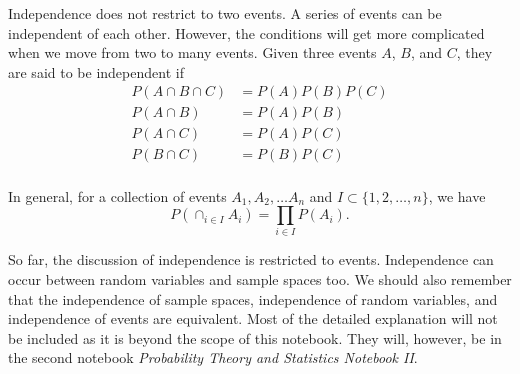 \documentclass[11pt, a4paper, oneside]{book}
\theoremstyle{definition}
\begin{document}
\noindent Independence does not restrict to two events. A series of events can be independent of each other. However, the conditions will get more complicated when we move from two to many events. Given three events $A$, $B$, and $C$, they are said to be independent if
\begin{equation*}
\begin{split}
P(A \cap B \cap C) &= P(A) P(B) P(C) \\
P(A \cap B) &= P(A) P(B) \\
P(A \cap C) &= P(A) P(C) \\
P(B \cap C) &= P(B) P(C) \\
\end{split}
\end{equation*}

\noindent In general, for a collection of events $A_1, A_2, \dots A_n$ and $I \subset \{1, 2, \dots, n\}$, we have \[
P(\cap_{i \in I}A_i) = \prod_{i \in I}P(A_i).
\]

\noindent So far, the discussion of independence is restricted to events. Independence can occur between random variables and sample spaces too. We should also remember that the independence of sample spaces, independence of random variables, and independence of events are equivalent. Most of the detailed explanation will not be included as it is beyond the scope of this notebook. They will, however, be in the second notebook \emph{Probability Theory and Statistics Notebook II}.


\backmatter
\end{document}

